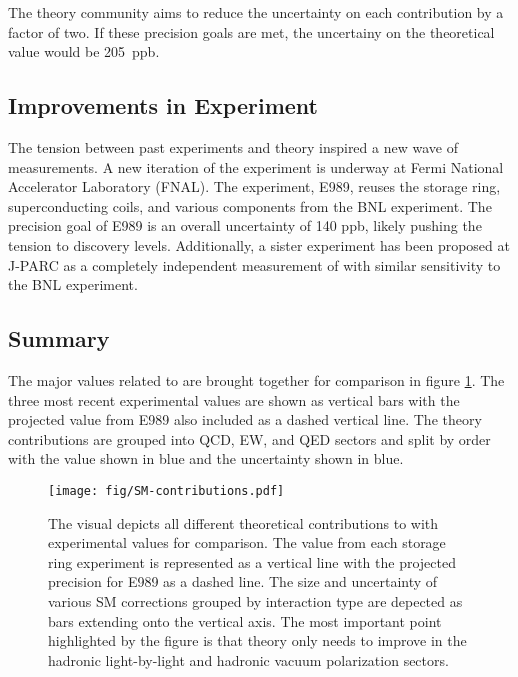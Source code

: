 The theory community aims to reduce the uncertainty on each contribution by a factor of two.  If these precision goals are met, the uncertainy on the theoretical value would be \SI{205}{ppb}.

\subsection{Improvements in Experiment}
The tension between past experiments and theory inspired a new wave of \mugmtwo measurements.  A new iteration of the \mugmtwo experiment is underway at Fermi National Accelerator Laboratory (FNAL). The experiment, E989, reuses the storage ring, superconducting coils, and various components from the BNL experiment.  The precision goal of E989 is an overall uncertainty of 140 ppb, likely pushing the tension to discovery levels. Additionally, a sister experiment has been proposed at J-PARC as a completely independent measurement of \mugmtwo with similar sensitivity to the BNL experiment.

\subsection{Summary}
The major values related to \mugmtwo are brought together for comparison in figure \ref{fig:sm-contributions}.  The three most recent experimental values are shown as vertical bars with the projected value from E989 also included as a dashed vertical line.  The theory contributions are grouped into QCD, EW, and QED sectors and split by order with the value shown in blue and the uncertainty shown in blue.

\begin{figure}
\label{fig:sm-contributions}
\centering
\texttt{[image: fig/SM-contributions.pdf]}
\caption{The visual depicts all different theoretical contributions to \mugmtwo with experimental values for comparison.  The value from each storage ring experiment is represented as a vertical line with the projected precision for E989 as a dashed line.  The size and uncertainty of various SM corrections grouped by interaction type are depected as bars extending onto the vertical axis. The most important point highlighted by the figure is that theory only needs to improve in the hadronic light-by-light and hadronic vacuum polarization sectors.}
\end{figure}

